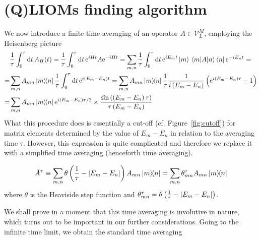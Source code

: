 
\section{(Q)LIOMs finding algorithm\label{sec:algorithm}}
We now introduce a finite time averaging of an operator \(A\in \mathcal{V}_L^M\), employing the Heisenberg picture~\autocite{Mierzejewski2015Approx}
\begin{align}
  & \frac{1}{\tau} \int_0^{\tau} \mathrm{d}t\, A_{H}(t) = \frac{1}{\tau} \int_0^{\tau} \mathrm{d}t\, \mathrm{e}^{i H t}A \mathrm{e}^{-i H t}
  =\sum_{m,n} \frac{1}{\tau} \int_0^{\tau} \mathrm{d}t\, \mathrm{e}^{i E_m t}\ket{m} \matrixel{m}{A}{n}\bra{n}  \mathrm{e}^{-i E_n t} = \nonumber{}           \\
  =                & \sum_{m,n} A_{mn}\ketbra{m}{n} \frac{1}{\tau} \int_0^{\tau} \mathrm{d}t \, \mathrm{e}^{i(E_m-E_n)t} =
  \sum_{m,n} A_{mn}\ketbra{m}{n} \frac{1}{\tau} \frac{1}{i\left(E_m-E_n\right)}\left(\mathrm{e}^{i\left(E_m-E_n\right)\tau}-1\right) \nonumber       \\
  =                & \sum_{m,n} A_{mn}\ketbra{m}{n}
  \mathrm{e}^{i\left(E_m-E_n\right)\tau/2}\times \frac{\sin{\left(\left(E_m-E_n\right)\tau\right)}}{\tau\left(E_m-E_n\right)}
  \label{eq:time_avg}
\end{align}
What this procedure does is essentially a cut-off (cf. Figure~\ref{fig:cutoff}) for matrix elements determined by the value of \(E_m-E_n\) in relation
to the averaging time \(\tau{}\). However, this expression is quite complicated and therefore we replace it with a simplified time
averaging (henceforth time averaging).
\begin{definition}
  \begin{equation}
    \bar{A}^{\tau} \equiv \sum_{m,n} \theta\left(\frac{1}{\tau} - \abs{E_m-E_n}\right) A_{mn} \ketbra{m}{n}
    = \sum_{m,n} \theta_{mn}^{\tau} A_{mn} \ketbra{m}{n}
    \label{def:simple time avg}
  \end{equation}
  where \(\theta{}\) is the Heaviside step function and \(\theta_{mn}^{\tau} = \theta\left(\frac{1}{\tau} - \abs{E_m-E_n}\right)\).
\end{definition}
We shall prove in a moment that this time averaging is involutive in nature, which turns out to be important in our further considerations.
Going to the infinite time limit, we obtain the standard time averaging
